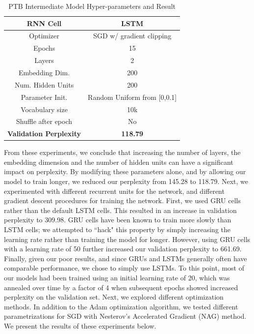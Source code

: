 \documentclass[a4paper]{article}
\begin{document}
\begin{table}[h!]
\centering
\begin{tabular}{|c | c|} 
 \hline
RNN Cell & LSTM\\ \hline
Optimizer & SGD w/ gradient clipping \\ \hline
Epochs & 15\\ \hline
Layers & 2\\ \hline
Embedding Dim. & 200\\ \hline
Num. Hidden Units & 200\\ \hline
Parameter Init. & Random Uniform from [0,0.1]\\ \hline
Vocabulary size & 10k\\ \hline
Shuffle after epoch & No \\ \hline
\textbf{Validation Perplexity} &\textbf{118.79} \\ \hline
\end{tabular}
\caption{PTB Intermediate Model Hyper-parameters and Result}
\label{table:1}
\end{table}

From these experiments, we conclude that increasing the number of layers, the embedding dimension and the number of hidden units can have a significant impact on perplexity. By modifying these parameters alone, and by allowing our model to train longer, we reduced our perplexity from 145.28 to 118.79.
\newline
\newline
Next, we experimented with different recurrent units for the network, and different gradient descent procedures for training the network. First, we used GRU cells rather than the default LSTM cells. This resulted in an increase in validation perplexity to 309.98. GRU cells have been known to train more slowly than LSTM cells; we attempted to ``hack" this property by simply increasing the learning rate rather than training the model for longer. However, using GRU cells with a learning rate of 50 further increased our validation perplexity to 661.69. Finally, given our poor results, and since GRUs and LSTMs generally often have comparable performance, we chose to simply use LSTMs.
\newline
\newline
To this point, most of our models had been trained using an initial learning rate of 20, which was annealed over time by a factor of 4 when subsequent epochs showed increased perplexity on the validation set. Next, we explored different optimization methods. In addition to the Adam optimization algorithm, we tested different parametrizations for SGD with Nesterov's Accelerated Gradient (NAG) method. We present the results of these experiments below.
\end{document}
